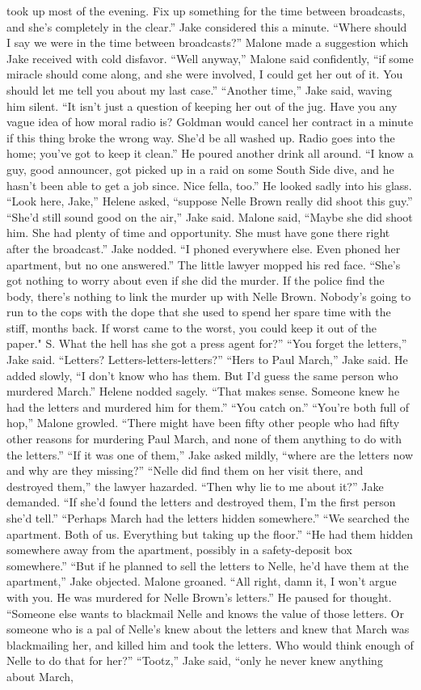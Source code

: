 \documentclass{novel}
\begin{document}
took up most of the evening. Fix up something for the time between broadcasts, and she’s completely in the clear.” Jake considered this a minute. “Where should I say we were in the time between broadcasts?” Malone made a suggestion which Jake received with cold disfavor. “Well anyway,” Malone said confidently, “if some miracle should come along, and she were involved, I could get her out of it. You should let me tell you about my last case.” “Another time,” Jake said, waving him silent. “It isn’t just a question of keeping her out of the jug. Have you any vague idea of how moral radio is? Goldman would cancel her contract in a minute if this thing broke the wrong way. She’d be all washed up. Radio goes into the home; you’ve got to keep it clean.” He poured another drink all around. “I know a guy, good announcer, got picked up in a raid on some South Side dive, and he hasn’t been able to get a job since. Nice fella, too.” He looked sadly into his glass. “Look here, Jake,” Helene asked, “suppose Nelle Brown really did shoot this guy.” “She’d still sound good on the air,” Jake said. Malone said, “Maybe she did shoot him. She had plenty of time and opportunity. She must have gone there right after the broadcast.” Jake nodded. “I phoned everywhere else. Even phoned her apartment, but no one answered.” The little lawyer mopped his red face. “She’s got nothing to worry about even if she did the murder. If the police find the body, there’s nothing to link the murder up with Nelle Brown. Nobody’s going to run to the cops with the dope that she used to spend her spare time with the stiff, months back. If worst came to the worst, you could keep it out of the paper." S. What the hell has she got a press agent for?” “You forget the letters,” Jake said. “Letters? Letters-letters-letters?” “Hers to Paul March,” Jake said. He added slowly, “I don’t know who has them. But I’d guess the same person who murdered March.” Helene nodded sagely. “That makes sense. Someone knew he had the letters and murdered him for them.” “You catch on.” “You’re both full of hop,” Malone growled. “There might have been fifty other people who had fifty other reasons for murdering Paul March, and none of them anything to do with the letters.” “If it was one of them,” Jake asked mildly, “where are the letters now and why are they missing?” “Nelle did find them on her visit there, and destroyed them,” the lawyer hazarded. “Then why lie to me about it?” Jake demanded. “If she’d found the letters and destroyed them, I’m the first person she’d tell.” “Perhaps March had the letters hidden somewhere.” “We searched the apartment. Both of us. Everything but taking up the floor.” “He had them hidden somewhere away from the apartment, possibly in a safety-deposit box somewhere.” “But if he planned to sell the letters to Nelle, he’d have them at the apartment,” Jake objected. Malone groaned. “All right, damn it, I won’t argue with you. He was murdered for Nelle Brown’s letters.” He paused for thought. “Someone else wants to blackmail Nelle and knows the value of those letters. Or someone who is a pal of Nelle’s knew about the letters and knew that March was blackmailing her, and killed him and took the letters. Who would think enough of Nelle to do that for her?” “Tootz,” Jake said, “only he never knew anything about March, 
\end{document}
